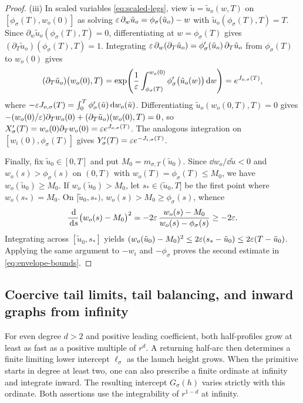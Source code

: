 \begin{proof}
(iii) In scaled variables \eqref{eq:scaled-legs}, view $\tilde{u}=\tilde{u}_o(w,T)$ on
$[\phi_\sigma(T),w_o(0)]$ as solving $\varepsilon\,\partial_w\tilde{u}_o=\phi_\sigma(\tilde{u}_o)-w$ with
$\tilde{u}_o(\phi_\sigma(T),T)=T$. Since $\partial_w\tilde{u}_o(\phi_\sigma(T),T)=0$, differentiating
at $w=\phi_\sigma(T)$ gives $(\partial_T\tilde{u}_o)(\phi_\sigma(T),T)=1$. Integrating
$\varepsilon\,\partial_w(\partial_T\tilde{u}_o)=\phi_\sigma'(\tilde{u}_o)\,\partial_T\tilde{u}_o$ from
$\phi_\sigma(T)$ to $w_o(0)$ gives
\[
  (\partial_T\tilde{u}_o)\bigl(w_o(0),T\bigr) =
  \exp\!\left(\frac{1}{\varepsilon}\int_{\phi_\sigma(T)}^{w_o(0)}\phi_\sigma'\bigl(\tilde{u}_o(w)\bigr)\,\mathrm{d}
  w\right) = e^{J_{o,\sigma}(T)},
\]
where $-\varepsilon J_{o,\sigma}(T)=\int_0^T\phi_\sigma'(\tilde{u})\,\mathrm{d} w_o(\tilde{u})$. Differentiating
$\tilde{u}_o(w_o(0,T),T)=0$ gives $-(w_o(0)/\varepsilon)\partial_T
w_o(0)+(\partial_T\tilde{u}_o)(w_o(0),T)=0$, so $X_\sigma'(T)=w_o(0)\partial_T w_o(0)=\varepsilon
e^{J_{o,\sigma}(T)}$. The analogous integration on $[w_i(0),\phi_\sigma(T)]$ gives $Y_\sigma'(T)=\varepsilon
e^{-J_{i,\sigma}(T)}$.

Finally, fix $\tilde{u}_0\in[0,T]$ and put $M_0=m_{\sigma,T}(\tilde{u}_0)$. Since $\dd
w_o/\dd\tilde{u}<0$ and $w_o(s)>\phi_\sigma(s)$ on $(0,T)$ with $w_o(T)=\phi_\sigma(T)\le M_0$, we
have $w_o(\tilde{u}_0)\ge M_0$. If $w_o(\tilde{u}_0)>M_0$, let $s_*\in(\tilde{u}_0,T]$ be the first
point where $w_o(s_*)=M_0$. On $[\tilde{u}_0,s_*)$, $w_o(s)>M_0\ge\phi_\sigma(s)$, whence
\[
  \frac{\,\mathrm{d}}{\,\mathrm{d} s}\bigl(w_o(s)-M_0\bigr)^2 = -2\varepsilon\,\frac{w_o(s)-M_0}{w_o(s)-\phi_\sigma(s)} \ge -2\varepsilon.
\]
Integrating across $[\tilde{u}_0,s_*]$ yields $(w_o(\tilde{u}_0)-M_0)^2\le 2\varepsilon(s_*-\tilde{u}_0)\le
2\varepsilon(T-\tilde{u}_0)$. Applying the same argument to $-w_i$ and $-\phi_\sigma$ proves the second
estimate in \eqref{eq:envelope-bounds}.
\end{proof}


\subsection{Coercive tail limits, tail balancing, and inward graphs from infinity}\label{subsec:tail-inward}

For even degree $d>2$ and positive leading coefficient, both half-profiles
grow at least as fast as a positive multiple of $r^d$. A returning
half-arc then determines a finite limiting lower intercept $\ell_\sigma$
as the launch height grows. When the primitive starts in degree at least
two, one can also prescribe a finite ordinate at infinity and integrate
inward. The resulting intercept $G_\sigma(h)$ varies strictly with this
ordinate. Both assertions use the integrability of $r^{1-d}$ at infinity.


